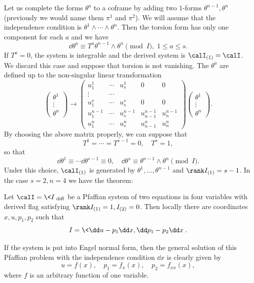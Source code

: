 Let us complete the forms $\theta^a$ to a coframe by adding two $1$-forms $\theta^{n-1},\theta^{n}$ (previously we would name them $\pi^1$ and $\pi^2$). We will assume that the independence condition is $\theta^1\wedge\cdots\wedge\theta^n$. Then the torsion form has only one component for each $a$ and we have 
\[\dd\theta^a\equiv T^a \theta^{n-1}\wedge\theta^n \pmod{I}, \; 1\leq a\leq s.\]
If $T^a=0$, the system is integrable and the derived system is $\calI_{(1)}=\calI$. We discard this case and suppose that torsion is not vanishing. The $\theta^a$ are defined up to the non-singular linear transformation 
\[
\begin{pmatrix}
    \theta^1 \\
    \vdots \\
    \theta^n
\end{pmatrix}\to 
\begin{pmatrix}
    u^1_1 & \cdots & u^1_s & 0 & 0\\
    \vdots & \cdots & & &\\
    u^s_1 & \cdots & u^s_s & 0 & 0\\
    u^{n-1}_1 & \cdots & u^{n-1}_s & u^{n-1}_{n-1}& u^{n-1}_n\\
    u^n_1 & \cdots & u^n_s & u^n_{n-1} & u^n_n
\end{pmatrix}
\begin{pmatrix}
    \theta^1 \\
    \vdots \\
    \theta^n
\end{pmatrix}.
\]
By choosing the above matrix properly, we can suppose that 
\[T^1=\cdots =T^{s-1}=0,\quad T^s=1,\]
so that 
\[\dd \theta^1\equiv \cdots \dd\theta^{s-1}\equiv 0,\quad \dd\theta^s\equiv \theta^{n-1}\wedge\theta^n \pmod{I}.\label{eq 31 Bryant}\]
Under this choice, $\calI_{(1)}$ is generated by $\theta^1,\ldots,\theta^{n-1}$ and $\rank I_{(1)}=s-1$. In the case $s=2,n=4$ we have the theorem:

\begin{thm}\label{thm 5.1 Bryant}
    Let $\calI=\<I\>_{\mathrm{diff}}$ be a Pfaffian system of two equations in four variables with derived flag satisfying $\rank I_{(1)}=1, I_{{(2)}}=0$. Then locally there are coordinates $x,u,p_1,p_2$ such that 
    \[I=\<\dd u-p_1\dd x,\dd p_1-p_2\dd x\>.\]
\end{thm}

If the system is put into Engel normal form, then the general solution of this Pfaffian problem with the independence condition $\dd x$ is clearly given by 
\[u=f(x),\quad p_1=f_x(x),\quad p_2=f_{xx}(x),\]
where $f$ is an arbitrary function of one variable.

